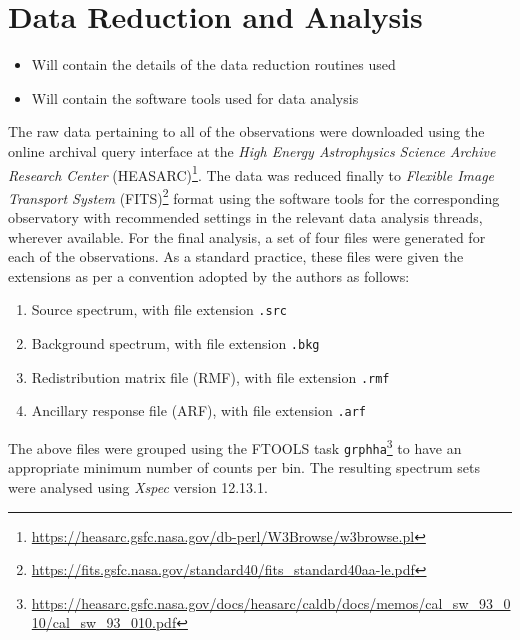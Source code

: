 \section{Data Reduction and Analysis} \label{sec:reduction-analysis}
    \begin{itemize}
        \item Will contain the details of the data reduction routines used
        \item Will contain the software tools used for data analysis
    \end{itemize}
    The raw data pertaining to all of the observations were downloaded using the online archival query interface at the \textit{High Energy Astrophysics Science Archive Research Center} (HEASARC)\footnote{\url{https://heasarc.gsfc.nasa.gov/db-perl/W3Browse/w3browse.pl}}. The data was reduced finally to \textit{Flexible Image Transport System} (FITS)\footnote{\url{https://fits.gsfc.nasa.gov/standard40/fits_standard40aa-le.pdf}} format using the software tools for the corresponding observatory with recommended settings in the relevant data analysis threads, wherever available. For the final analysis, a set of four files were generated for each of the observations. As a standard practice, these files were given the extensions as per a convention adopted by the authors as follows:
    \begin{enumerate}
    	\item Source spectrum, with file extension \texttt{.src}
    	\item Background spectrum, with file extension \texttt{.bkg}
    	\item Redistribution matrix file (RMF), with file extension \texttt{.rmf}
    	\item Ancillary response file (ARF), with file extension \texttt{.arf}
    \end{enumerate}
    The above files were grouped using the FTOOLS task \texttt{grphha}\footnote{\url{https://heasarc.gsfc.nasa.gov/docs/heasarc/caldb/docs/memos/cal_sw_93_010/cal_sw_93_010.pdf}} to have an appropriate minimum number of counts per bin. The resulting spectrum sets were analysed using \textit{Xspec} version 12.13.1.
    
